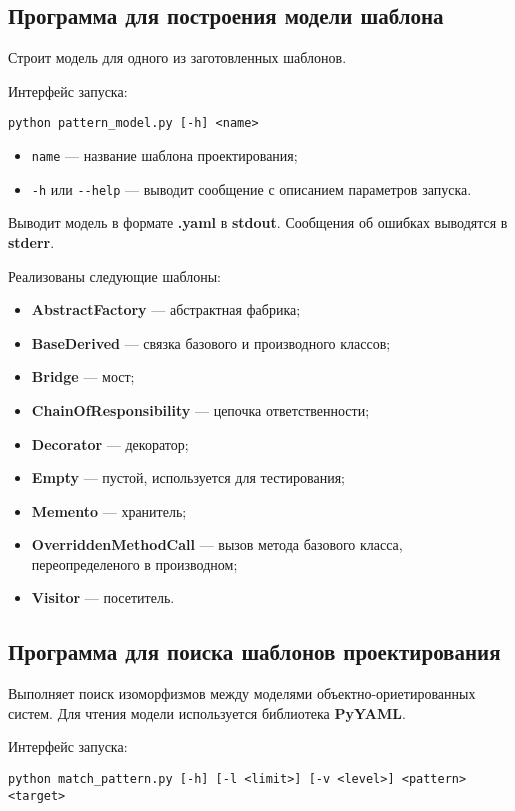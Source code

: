 \subsection{Программа для построения модели шаблона}

Строит модель для одного из заготовленных шаблонов.

Интерфейс запуска:
\begin{verbatim}
python pattern_model.py [-h] <name>
\end{verbatim}

\begin{itemize}
\item \verb;name; --- название шаблона проектирования;
\item \verb;-h; или \verb;--help; --- выводит сообщение с описанием параметров
запуска.
\end{itemize}

Выводит модель в формате \textbf{.yaml} в \textbf{stdout}.
Сообщения об ошибках выводятся в \textbf{stderr}.

Реализованы следующие шаблоны:
\begin{itemize}
\item \textbf{AbstractFactory} --- абстрактная фабрика;
\item \textbf{BaseDerived} --- связка базового и производного классов;
\item \textbf{Bridge} --- мост;
\item \textbf{ChainOfResponsibility} --- цепочка ответственности;
\item \textbf{Decorator} --- декоратор;
\item \textbf{Empty} --- пустой, используется для тестирования;
\item \textbf{Memento} --- хранитель;
\item \textbf{OverriddenMethodCall} --- вызов метода базового класса,
переопределеного в производном;
\item \textbf{Visitor} --- посетитель.
\end{itemize}

\subsection{Программа для поиска шаблонов проектирования}

Выполняет поиск изоморфизмов между моделями объектно-ориетированных систем.
Для чтения модели используется библиотека \textbf{PyYAML}.

Интерфейс запуска:
\begin{verbatim}
python match_pattern.py [-h] [-l <limit>] [-v <level>] <pattern> <target>
\end{verbatim}

